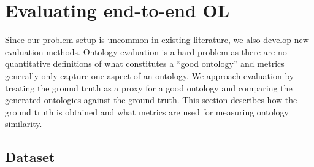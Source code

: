 \section{Evaluating end-to-end OL}  \label{sec:implementation:evaluation}

Since our problem setup is uncommon in existing literature, we also develop new evaluation methods. Ontology evaluation is a hard problem as there are no quantitative definitions of what constitutes a ``good ontology'' and metrics generally only capture one aspect of an ontology. We approach evaluation by treating the ground truth as a proxy for a good ontology and comparing the generated ontologies against the ground truth. This section describes how the ground truth is obtained and what metrics are used for measuring ontology similarity.


\subsection{Dataset}



